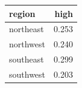 \begin{tabular}{lr}
\toprule
region & high \\
\midrule
northeast & 0.253 \\
northwest & 0.240 \\
southeast & 0.299 \\
southwest & 0.203 \\
\bottomrule
\end{tabular}
